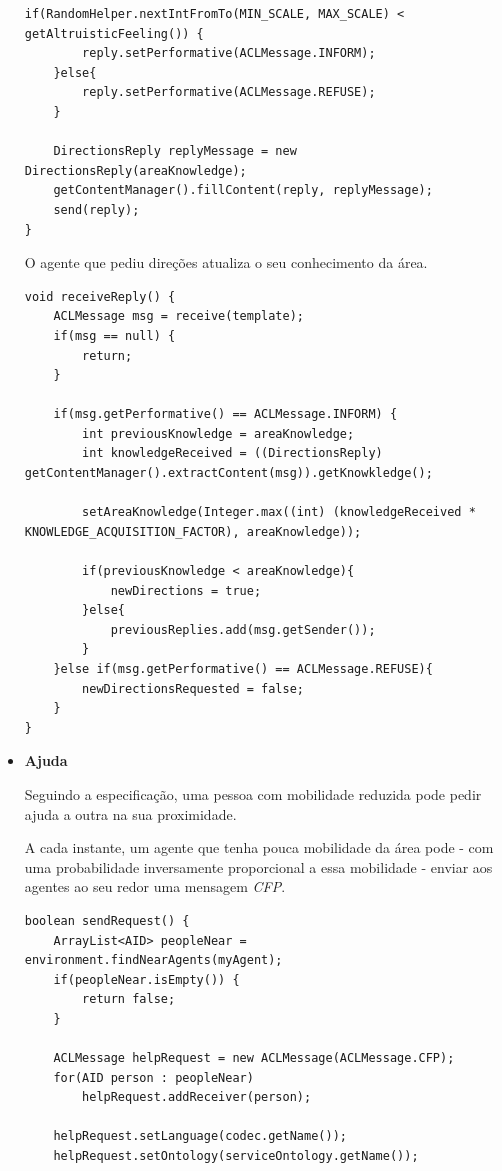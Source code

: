 \documentclass[12pt]{article}
\begin{document}
\begin{titlepage}
\begin{itemize}
\begin{lstlisting}[caption= Código \textit{Java}\ da função responsável pela receção de pedidos de direções.]
	if(RandomHelper.nextIntFromTo(MIN_SCALE, MAX_SCALE) < getAltruisticFeeling()) {
		reply.setPerformative(ACLMessage.INFORM);
	}else{
		reply.setPerformative(ACLMessage.REFUSE);
	}
	
	DirectionsReply replyMessage = new DirectionsReply(areaKnowledge);
	getContentManager().fillContent(reply, replyMessage);
	send(reply);
}
\end{lstlisting}

O agente que pediu direções atualiza o seu conhecimento da área.

\begin{lstlisting}[caption= Código \textit{Java}\ da função responsável pela receção de respostas a um pedido de direções.]
void receiveReply() {
	ACLMessage msg = receive(template);
	if(msg == null) {
		return;
	}
	
	if(msg.getPerformative() == ACLMessage.INFORM) {				
		int previousKnowledge = areaKnowledge;
		int knowledgeReceived = ((DirectionsReply) getContentManager().extractContent(msg)).getKnowkledge();
		
		setAreaKnowledge(Integer.max((int) (knowledgeReceived * KNOWLEDGE_ACQUISITION_FACTOR), areaKnowledge));
		
		if(previousKnowledge < areaKnowledge){
			newDirections = true;
		}else{
			previousReplies.add(msg.getSender());
		}
	}else if(msg.getPerformative() == ACLMessage.REFUSE){			
		newDirectionsRequested = false;
	}
}
\end{lstlisting}
\item \textbf{Ajuda}

Seguindo a especificação, uma pessoa com mobilidade reduzida pode pedir ajuda a outra na sua proximidade. 

A cada instante, um agente que tenha pouca mobilidade da área pode - com uma probabilidade inversamente proporcional a essa mobilidade - enviar aos agentes ao seu redor uma mensagem \textit{CFP}.

\begin{lstlisting}[caption= Código \textit{Java}\ de envio de um pedido de ajuda.]
boolean sendRequest() {
	ArrayList<AID> peopleNear = environment.findNearAgents(myAgent);
	if(peopleNear.isEmpty()) {
		return false;
	}

	ACLMessage helpRequest = new ACLMessage(ACLMessage.CFP);
	for(AID person : peopleNear)
		helpRequest.addReceiver(person);
	
	helpRequest.setLanguage(codec.getName());
	helpRequest.setOntology(serviceOntology.getName());
	

\end{lstlisting}
\end{itemize}
\end{titlepage}
\end{document}
